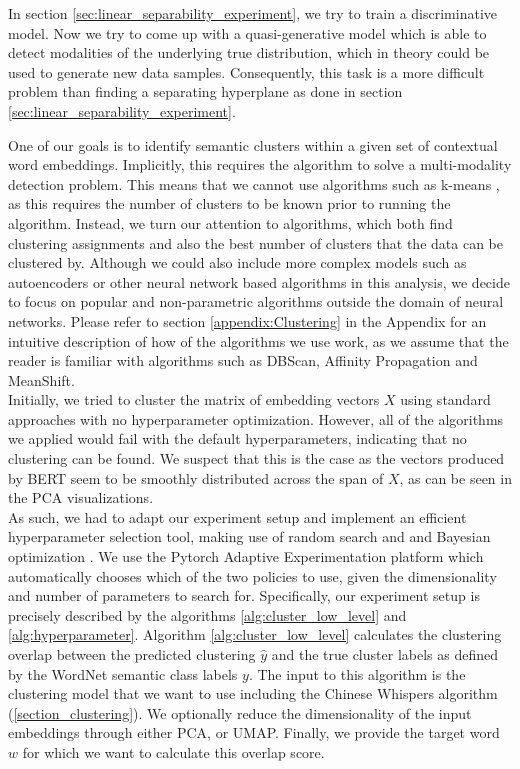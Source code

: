 \documentclass[a4paper,12pt,oneside,openright]{report}
\begin{document}
In section \ref{sec:linear_separability_experiment}, we try to train a discriminative model.
Now we try to come up with a quasi-generative model which is able to detect modalities of the underlying true distribution, which in theory could be used to generate new data samples.
Consequently, this task is a more difficult problem than finding a separating hyperplane as done in section \ref{sec:linear_separability_experiment}. 

One of our goals is to identify semantic clusters within a given set of contextual word embeddings.
Implicitly, this requires the algorithm to solve a multi-modality detection problem.
This means that we cannot use algorithms such as k-means \cite{lloyd57, macqueen67}, as this requires the number of clusters to be known prior to running the algorithm.
Instead, we turn our attention to algorithms, which both find clustering assignments and also the best number of clusters that the data can be clustered by.
Although we could also include more complex models such as autoencoders or other neural network based algorithms in this analysis, we decide to focus on popular and non-parametric algorithms outside the domain of neural networks.
Please refer to section \ref{appendix:Clustering} in the Appendix for an intuitive description of how of the algorithms we use work, as we assume that the reader is familiar with algorithms such as DBScan, Affinity Propagation and MeanShift. \\

Initially, we tried to cluster the matrix of embedding vectors $X$ using standard approaches with no hyperparameter optimization. 
However, all of the algorithms we applied would fail with the default hyperparameters, indicating that no clustering can be found.
We suspect that this is the case as the vectors produced by BERT seem to be smoothly distributed across the span of $X$, as can be seen in the PCA visualizations. \\

As such, we had to adapt our experiment setup and implement an efficient hyperparameter selection tool, making use of random search and \cite{bergstra12} and Bayesian optimization \cite{wang13}.
We use the Pytorch Adaptive Experimentation platform \cite{pyax} which automatically chooses which of the two policies to use, given the dimensionality and number of parameters to search for.
Specifically, our experiment setup is precisely described by the algorithms \ref{alg:cluster_low_level} and \ref{alg:hyperparameter}.
Algorithm \ref{alg:cluster_low_level} calculates the clustering overlap between the predicted clustering $\hat{y}$ and the true cluster labels as defined by the WordNet semantic class labels $y$.
The input to this algorithm is the clustering model that we want to use including the Chinese Whispers algorithm (\ref{section_clustering}). 
We optionally reduce the dimensionality of the input embeddings through either PCA, or UMAP.
Finally, we provide the target word $w$ for which we want to calculate this overlap score.
\end{document}
